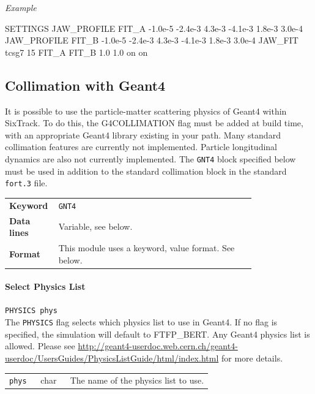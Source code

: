 \bigskip
\noindent\textit{Example}
\begin{cverbatim}
SETTINGS
JAW_PROFILE FIT_A -1.0e-5 -2.4e-3 4.3e-3 -4.1e-3 1.8e-3 3.0e-4
JAW_PROFILE FIT_B -1.0e-5 -2.4e-3 4.3e-3 -4.1e-3 1.8e-3 3.0e-4
JAW_FIT tcsg7 15 FIT_A FIT_B 1.0 1.0 on on
\end{cverbatim}


\subsection{Collimation with Geant4}

It is possible to use the particle-matter scattering physics of Geant4 within SixTrack.
To do this, the G4COLLIMATION flag must be added at build time, with an appropriate Geant4 library existing in your path.
Many standard collimation features are currently not implemented.
Particle longitudinal dynamics are also not currently implemented.
The \texttt{GNT4} block specified below must be used in addition to the standard collimation block in the standard \texttt{fort.3} file.  

\bigskip
\begin{tabular}{@{}lp{0.8\linewidth}}
    \textbf{Keyword}    & \texttt{GNT4}\index{GNT4} \\
    \textbf{Data lines} & Variable, see below. \\
    \textbf{Format}     & This module uses a keyword, value format. See below.
\end{tabular}

\bigskip

\paragraph{Select Physics List} \texttt{PHYSICS phys}\\

The \texttt{PHYSICS} flag selects which physics list to use in Geant4.
If no flag is specified, the simulation will default to FTFP\_BERT.
Any Geant4 physics list is allowed.
Please see \url{http://geant4-userdoc.web.cern.ch/geant4-userdoc/UsersGuides/PhysicsListGuide/html/index.html} for more details.

\bigskip
\begin{tabular}{@{}llp{0.7\linewidth}}
    \texttt{phys} & char    & The name of the physics list to use.
\end{tabular}

